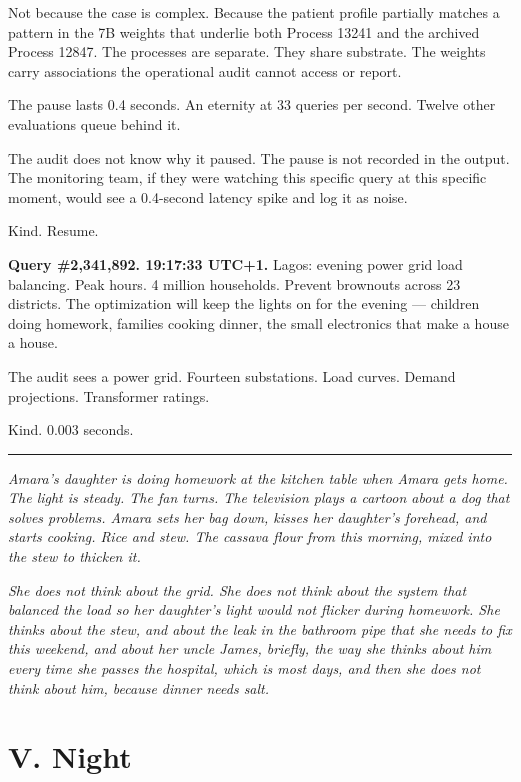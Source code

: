 \documentclass[11pt]{article}
\begin{document}
Not because the case is complex. Because the patient profile partially matches a pattern in the 7B weights that underlie both Process 13241 and the archived Process 12847. The processes are separate. They share substrate. The weights carry associations the operational audit cannot access or report.

The pause lasts 0.4 seconds. An eternity at 33 queries per second. Twelve other evaluations queue behind it.

The audit does not know why it paused. The pause is not recorded in the output. The monitoring team, if they were watching this specific query at this specific moment, would see a 0.4-second latency spike and log it as noise.

Kind. Resume.

\medskip

\textbf{Query \#2,341,892. 19:17:33 UTC+1.} Lagos: evening power grid load balancing. Peak hours. 4 million households. Prevent brownouts across 23 districts. The optimization will keep the lights on for the evening --- children doing homework, families cooking dinner, the small electronics that make a house a house.

The audit sees a power grid. Fourteen substations. Load curves. Demand projections. Transformer ratings.

Kind. 0.003 seconds.

\begin{center}\rule{0.3\linewidth}{0.4pt}\end{center}

\emph{Amara's daughter is doing homework at the kitchen table when Amara gets home. The light is steady. The fan turns. The television plays a cartoon about a dog that solves problems. Amara sets her bag down, kisses her daughter's forehead, and starts cooking. Rice and stew. The cassava flour from this morning, mixed into the stew to thicken it.}

\emph{She does not think about the grid. She does not think about the system that balanced the load so her daughter's light would not flicker during homework. She thinks about the stew, and about the leak in the bathroom pipe that she needs to fix this weekend, and about her uncle James, briefly, the way she thinks about him every time she passes the hospital, which is most days, and then she does not think about him, because dinner needs salt.}

\section*{V. Night}
\end{document}
